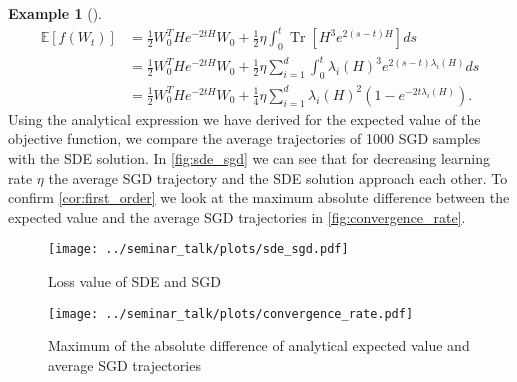 \documentclass[12pt]{article}
\theoremstyle{definition}
\newtheorem{example}[example]{Example}
\numberwithin{equation}{section}
\newcommand{\ev}[1]{\mathbb{E}\left[{#1}\right]}
\DeclareMathOperator{\Tr}{Tr}
\begin{document}
\begin{example}[\autocite{liStochasticModifiedEquations2019}]
\begin{equation}
\begin{split}
    \label{eq:analytical_expected_value}
    \ev{f(W_t)} &= \frac{1}{2}W_0^THe^{-2tH}W_0 + \frac{1}{2}\eta \int_0^t\Tr\left[H^3e^{2(s-t)H}\right]ds \\
    &= \frac{1}{2}W_0^THe^{-2tH}W_0 + \frac{1}{2}\eta \sum_{i=1}^d \int_0^t\lambda_i(H)^3e^{2(s-t)\lambda_i(H)}ds \\
    & = \frac{1}{2}W_0^THe^{-2tH}W_0 + \frac{1}{4}\eta \sum_{i=1}^d \lambda_i(H)^2\left(1 - e^{-2t\lambda_i(H)}\right).
  \end{split}
\end{equation}
Using the analytical expression we have derived for the expected value of the objective function, we compare the average trajectories of 1000 SGD samples with the SDE solution. In \autoref{fig:sde_sgd} we can see that for decreasing learning rate $\eta$ the average SGD trajectory and the SDE solution approach each other.
To confirm \autoref{cor:first_order} we look at the maximum absolute difference between the expected value and the average SGD trajectories in \autoref{fig:convergence_rate}.

\begin{figure}
  \centering
  \texttt{[image: ../seminar\_talk/plots/sde\_sgd.pdf]}
  \caption{Loss value of SDE and SGD}
  \label{fig:sde_sgd}
\end{figure}
\begin{figure}
  \centering
  \texttt{[image: ../seminar\_talk/plots/convergence\_rate.pdf]}
  \caption{Maximum of the absolute difference of analytical expected value and average SGD trajectories}
  \label{fig:convergence_rate}
\end{figure}
\end{example}
\end{document}

